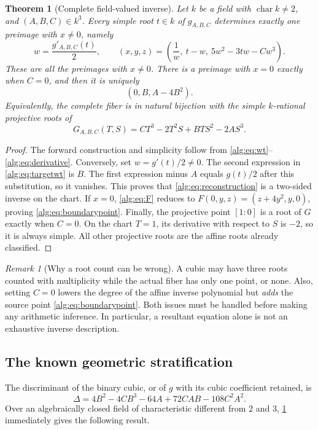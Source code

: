 \documentclass[11pt]{article}
\numberwithin{equation}{section}
\newtheorem{theorem}{Theorem}[section]
\theoremstyle{plain}
\theoremstyle{plain}
\theoremstyle{plain}
\theoremstyle{definition}
\theoremstyle{definition}
\theoremstyle{definition}
\theoremstyle{remark}
\newtheorem{remark}[remark]{Remark}
\begin{document}
\begin{theorem}[Complete field-valued inverse]\label{alg:thm:root}
Let $k$ be a field with $\operatorname{char}k\ne2$, and
$(A,B,C)\in k^3$. Every simple root $t\in k$ of
$g_{A,B,C}$ determines exactly one preimage with $x\ne0$, namely
\begin{equation}\label{alg:eq:reconstruction}
 w=\frac{g'_{A,B,C}(t)}2,\qquad
 (x,y,z)=\left(\frac1w,\ t-w,\ 5w^2-3tw-Cw^3\right).
\end{equation}
These are all the preimages with $x\ne0$. There is a preimage with
$x=0$ exactly when $C=0$, and then it is uniquely
\begin{equation}\label{alg:eq:boundarypoint}
 (0,B,A-4B^2).
\end{equation}
Equivalently, the complete fiber is in natural bijection with the simple
$k$-rational projective roots of
\begin{equation}\label{alg:eq:binarycubic}
G_{A,B,C}(T,S)=CT^3-2T^2S+BTS^2-2AS^3.
\end{equation}
\end{theorem}
\begin{proof}
The forward construction and simplicity follow from
\eqref{alg:eq:wt}--\eqref{alg:eq:derivative}. Conversely, set $w=g'(t)/2\ne0$.
The second expression in \eqref{alg:eq:targetwt} is $B$. The first expression
minus $A$ equals $g(t)/2$ after this substitution, so it vanishes.
This proves that \eqref{alg:eq:reconstruction} is a two-sided inverse
on the chart. If $x=0$, \eqref{alg:eq:F} reduces to
$F(0,y,z)=(z+4y^2,y,0)$, proving \eqref{alg:eq:boundarypoint}.
Finally, the projective point $[1:0]$ is a root of $G$ exactly when
$C=0$. On the chart $T=1$, its derivative with respect to $S$ is $-2$,
so it is always simple. All other projective roots are the affine roots
already classified.
\end{proof}

\begin{remark}[Why a root count can be wrong]
A cubic may have three roots counted with multiplicity while the actual
fiber has only one point, or none. Also, setting $C=0$ lowers the degree
of the affine inverse polynomial but \emph{adds} the source point
\eqref{alg:eq:boundarypoint}. Both issues must be handled before making any
arithmetic inference. In particular, a resultant equation alone is not
an exhaustive inverse description.
\end{remark}

\subsection{The known geometric stratification}
The discriminant of the binary cubic, or of $g$ with its cubic coefficient
retained, is
\begin{equation}\label{alg:eq:discriminant}
\Delta=4B^2-4CB^3-64A+72CAB-108C^2A^2.
\end{equation}
Over an algebraically closed field of characteristic different from
$2$ and $3$, \cref{alg:thm:root} immediately gives the following result.
\end{document}
